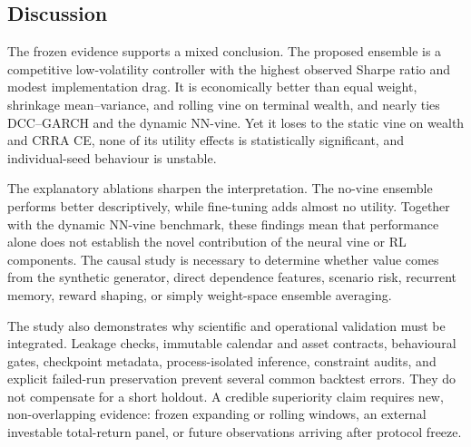 \subsection{Discussion}
\label{subsec:4_discussion}

The frozen evidence supports a mixed conclusion. The proposed ensemble is a competitive low-volatility controller with the highest observed Sharpe ratio and modest implementation drag. It is economically better than equal weight, shrinkage mean--variance, and rolling vine on terminal wealth, and nearly ties DCC--GARCH and the dynamic NN-vine. Yet it loses to the static vine on wealth and CRRA CE, none of its utility effects is statistically significant, and individual-seed behaviour is unstable.

The explanatory ablations sharpen the interpretation. The no-vine ensemble performs better descriptively, while fine-tuning adds almost no utility. Together with the dynamic NN-vine benchmark, these findings mean that performance alone does not establish the novel contribution of the neural vine or RL components. The causal study is necessary to determine whether value comes from the synthetic generator, direct dependence features, scenario risk, recurrent memory, reward shaping, or simply weight-space ensemble averaging.

The study also demonstrates why scientific and operational validation must be integrated. Leakage checks, immutable calendar and asset contracts, behavioural gates, checkpoint metadata, process-isolated inference, constraint audits, and explicit failed-run preservation prevent several common backtest errors. They do not compensate for a short holdout. A credible superiority claim requires new, non-overlapping evidence: frozen expanding or rolling windows, an external investable total-return panel, or future observations arriving after protocol freeze.

